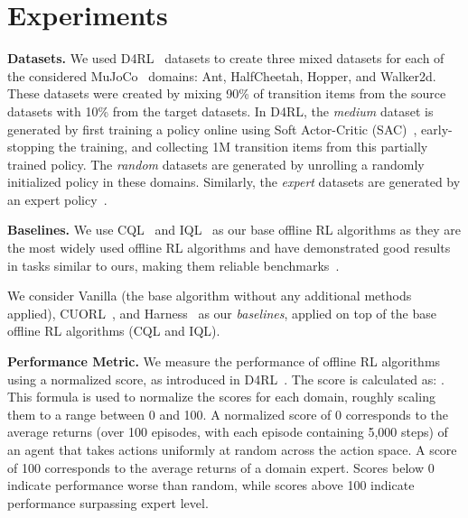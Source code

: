 \section{Experiments}
\label{sec:experiments}
\textbf{Datasets.}  We used D4RL~\citep{fu2020d4rl} datasets to create three mixed datasets for each of the considered MuJoCo~\citep{todorov2012mujoco} domains: Ant, HalfCheetah, Hopper, and Walker2d. These datasets were created by mixing 90\% of transition items from the source datasets with 10\% from the target datasets. In D4RL, the \textit{medium} dataset is generated by first training a policy online using Soft Actor-Critic (SAC)~\citep{haarnoja2018soft}, early-stopping the training, and collecting 1M transition items from this partially trained policy. The \textit{random} datasets are generated by unrolling a randomly initialized policy in these domains. Similarly, the \textit{expert} datasets are generated by an expert policy~\citep{fu2020d4rl}.

\vspace{0.5em}
\noindent\textbf{Baselines.} We use CQL~\citep{kumar2020conservative} and IQL~\citep{kostrikov2021offline} as our base offline RL algorithms as they are the most widely used offline RL algorithms and have demonstrated good results in tasks similar to ours, making them reliable benchmarks~\citep{fujita2021chainerrl,seno2022d3rlpy,sun2023offlinerl}. 

We consider Vanilla (the base algorithm without any additional methods applied), CUORL~\citep{cai2023curriculum}, and Harness~\citep{hong2023harnessing} as our \textit{baselines}, applied on top of the base offline RL algorithms (CQL and IQL). 

\vspace{0.5em}
\noindent\textbf{Performance Metric.} We measure the performance of offline RL algorithms using a normalized score, as introduced in D4RL~\citep{fu2020d4rl}. The score is calculated as: . This formula is used to normalize the scores for each domain, roughly scaling them to a range between 0 and 100. A normalized score of 0 corresponds to the average returns (over 100 episodes, with each episode containing 5,000 steps) of an agent that takes actions uniformly at random across the action space. A score of 100 corresponds to the average returns of a domain expert. Scores below 0 indicate performance worse than random, while scores above 100 indicate performance surpassing expert level.

